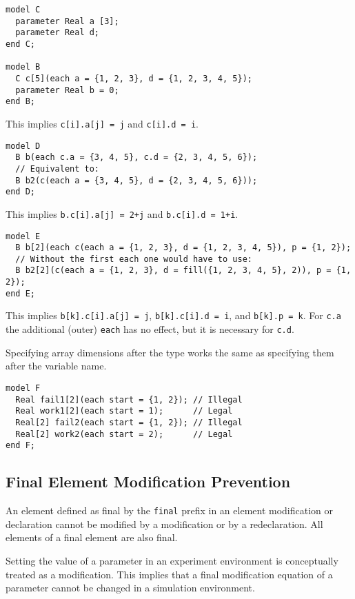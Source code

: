 \begin{example}
\begin{lstlisting}[language=modelica]
model C
  parameter Real a [3];
  parameter Real d;
end C;

model B
  C c[5](each a = {1, 2, 3}, d = {1, 2, 3, 4, 5});
  parameter Real b = 0;
end B;
\end{lstlisting}
This implies \lstinline!c[i].a[j] = j! and \lstinline!c[i].d = i!.

\begin{lstlisting}[language=modelica]
model D
  B b(each c.a = {3, 4, 5}, c.d = {2, 3, 4, 5, 6});
  // Equivalent to:
  B b2(c(each a = {3, 4, 5}, d = {2, 3, 4, 5, 6}));
end D;
\end{lstlisting}
This implies \lstinline!b.c[i].a[j] = 2+j! and \lstinline!b.c[i].d = 1+i!.
\begin{lstlisting}[language=modelica]
model E
  B b[2](each c(each a = {1, 2, 3}, d = {1, 2, 3, 4, 5}), p = {1, 2});
  // Without the first each one would have to use:
  B b2[2](c(each a = {1, 2, 3}, d = fill({1, 2, 3, 4, 5}, 2)), p = {1, 2});
end E;
\end{lstlisting}
This implies \lstinline!b[k].c[i].a[j] = j!, \lstinline!b[k].c[i].d = i!, and \lstinline!b[k].p = k!.  For \lstinline!c.a! the additional (outer) \lstinline!each! has no effect, but it is necessary for \lstinline!c.d!.

Specifying array dimensions after the type works the same as specifying them after the variable name.
\begin{lstlisting}[language=modelica]
model F
  Real fail1[2](each start = {1, 2}); // Illegal
  Real work1[2](each start = 1);      // Legal
  Real[2] fail2(each start = {1, 2}); // Illegal
  Real[2] work2(each start = 2);      // Legal
end F;
\end{lstlisting}
\end{example}

\subsection{Final Element Modification Prevention}\label{final-element-modification-prevention}

An element defined as final by the \lstinline!final! prefix in an element modification or declaration cannot be modified by a modification or by a redeclaration.  All elements of a final element are also final.

\begin{nonnormative}
Setting the value of a parameter in an experiment environment is conceptually treated as a modification.  This implies that a final modification equation
of a parameter cannot be changed in a simulation environment.
\end{nonnormative}

